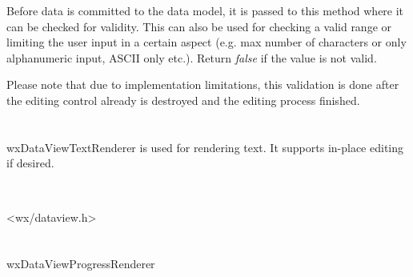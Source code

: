 \label{wxdataviewrenderervalidate}


Before data is committed to the data model, it is passed to this
method where it can be checked for validity. This can also be
used for checking a valid range or limiting the user input in
a certain aspect (e.g. max number of characters or only alphanumeric
input, ASCII only etc.). Return {\it false} if the value is
not valid.

Please note that due to implementation limitations, this validation
is done after the editing control already is destroyed and the
editing process finished.


\section{}\label{wxdataviewtextrenderer}

wxDataViewTextRenderer is used for rendering text. It supports
in-place editing if desired.



\\


<wx/dataview.h>




\label{wxdataviewtextrendererwxdataviewtextrenderer}




\section{}\label{wxdataviewprogressrenderer}

wxDataViewProgressRenderer



\\


